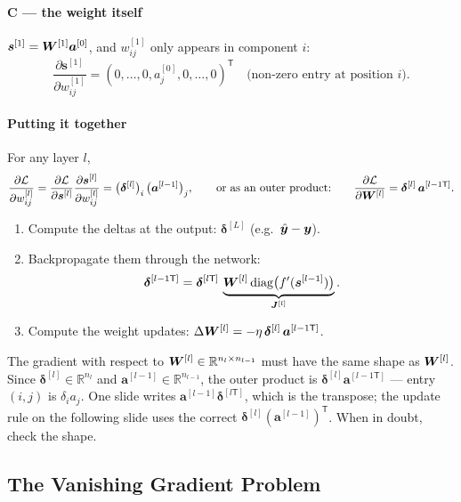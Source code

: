 \documentclass[11pt, oneside]{book}
\newcommand{\R}{\mathbb{R}}
\newcommand{\pd}[2]{\frac{\partial #1}{\partial #2}}
\newcommand{\T}{^{\mathsf{T}}}           %
\newcommand{\diag}{\operatorname{diag}}
\newcommand{\loss}{\mathcal{L}}          %
\newcommand{\params}{\boldsymbol{\theta}}   %
\newcommand{\ba}{\bm{a}}        \newcommand{\bs}{\bm{s}}
\newcommand{\bdelta}{\bm{\delta}}
\newcommand{\byhat}{\hat{\bm{y}}}
\newcommand{\lay}[1]{^{[#1]}}            %
\let\originalsubsection\subsection
\renewcommand{\subsection}{\Needspace{6\baselineskip}\originalsubsection}
\begin{document}
\paragraph{C --- the weight itself}
$\bs\lay{1} = \bW\lay{1}\ba\lay{0}$, and $w\lay{1}_{ij}$ only appears in
component $i$:
\[
  \pd{\bs\lay{1}}{w\lay{1}_{ij}} = (0, \dots, 0, a\lay{0}_j, 0, \dots, 0)\T
  \quad\text{(non-zero entry at position } i\text{)}.
\]

\paragraph{Putting it together}
For any layer $l$,
\[
  \pd{\loss}{w\lay{l}_{ij}} = \pd{\loss}{\bs\lay{l}}\pd{\bs\lay{l}}{w\lay{l}_{ij}}
  = \bigl(\bdelta\lay{l}\bigr)_i\,\bigl(\ba\lay{l-1}\bigr)_j,
  \qquad\text{or as an outer product:}\qquad
  \pd{\loss}{\bW\lay{l}} = \bdelta\lay{l}\,\ba\lay{l-1\mathsf{T}} .
\]

\begin{thmbox}[title={Backpropagation in deep networks}]
\begin{enumerate}
  \item Compute the deltas at the output: $\bdelta\lay{L}$ (e.g.\ $\byhat - \by$).
  \item Backpropagate them through the network:
    \[
      \bdelta\lay{l-1\mathsf{T}} = \bdelta\lay{l\mathsf{T}}\,
      \underbrace{\bW\lay{l}\diag\bigl(f'(\bs\lay{l-1})\bigr)}_{\bJ\lay{l}} .
    \]
  \item Compute the weight updates:
    $\Delta\bW\lay{l} = -\eta\,\bdelta\lay{l}\,\ba\lay{l-1\mathsf{T}}$.
\end{enumerate}
\end{thmbox}

\begin{notebox}[title={Shape check: $\bdelta\,\ba\T$, not $\ba\,\bdelta\T$}]
The gradient with respect to $\bW\lay{l} \in \R^{n_l \times n_{l-1}}$ must
have the same shape as $\bW\lay{l}$. Since $\bdelta\lay{l} \in \R^{n_l}$ and
$\ba\lay{l-1} \in \R^{n_{l-1}}$, the outer product is
$\bdelta\lay{l}\ba\lay{l-1\mathsf{T}}$ --- entry $(i,j)$ is
$\delta_i a_j$. One slide writes $\ba\lay{l-1}\bdelta\lay{l\mathsf{T}}$, which
is the transpose; the update rule on the following slide uses the correct
$\bdelta\lay{l}(\ba\lay{l-1})\T$. When in doubt, check the shape.
\end{notebox}

\subsection{The Vanishing Gradient Problem}
\label{sec:vgp}
\end{document}
